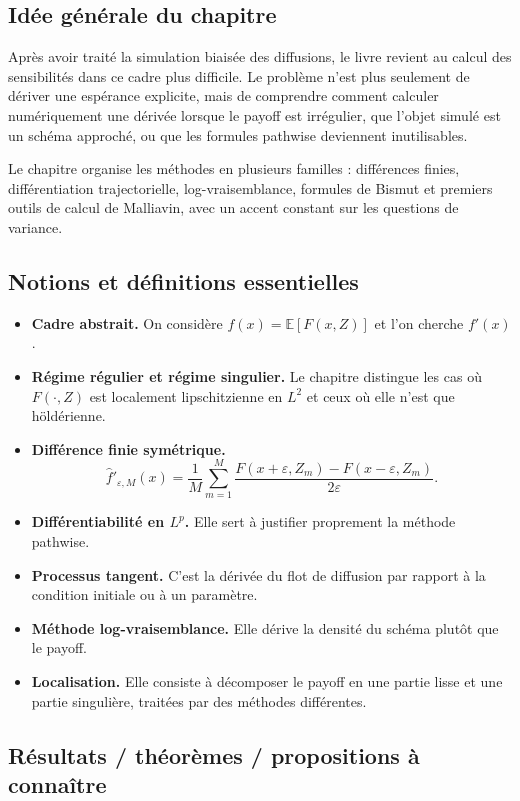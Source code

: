 \documentclass[11pt,a4paper]{article}
\newcommand{\E}{\mathbb{E}}
\begin{document}
\subsection{Idée générale du chapitre}

Après avoir traité la simulation biaisée des diffusions, le livre revient au calcul des sensibilités dans ce cadre plus difficile. Le problème n'est plus seulement de dériver une espérance explicite, mais de comprendre comment calculer numériquement une dérivée lorsque le payoff est irrégulier, que l'objet simulé est un schéma approché, ou que les formules pathwise deviennent inutilisables.

Le chapitre organise les méthodes en plusieurs familles : différences finies, différentiation trajectorielle, log-vraisemblance, formules de Bismut et premiers outils de calcul de Malliavin, avec un accent constant sur les questions de variance.

\subsection{Notions et définitions essentielles}

\begin{itemize}
  \item \textbf{Cadre abstrait.} On considère $f(x)=\E[F(x,Z)]$ et l'on cherche $f'(x)$.
  \item \textbf{Régime régulier et régime singulier.} Le chapitre distingue les cas où $F(\cdot,Z)$ est localement lipschitzienne en $L^2$ et ceux où elle n'est que höldérienne.
  \item \textbf{Différence finie symétrique.}
  \[
    \widehat f'_{\varepsilon,M}(x)=\frac{1}{M}\sum_{m=1}^M
    \frac{F(x+\varepsilon,Z_m)-F(x-\varepsilon,Z_m)}{2\varepsilon}.
  \]
  \item \textbf{Différentiabilité en $L^p$.} Elle sert à justifier proprement la méthode pathwise.
  \item \textbf{Processus tangent.} C'est la dérivée du flot de diffusion par rapport à la condition initiale ou à un paramètre.
  \item \textbf{Méthode log-vraisemblance.} Elle dérive la densité du schéma plutôt que le payoff.
  \item \textbf{Localisation.} Elle consiste à décomposer le payoff en une partie lisse et une partie singulière, traitées par des méthodes différentes.
\end{itemize}

\subsection{Résultats / théorèmes / propositions à connaître}
\end{document}
